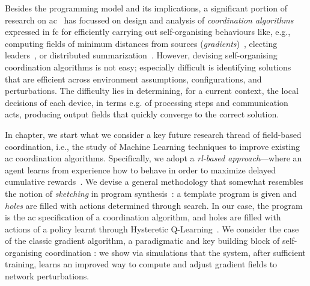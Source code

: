 Besides the programming model and its implications,
 a significant portion of research on \ac{ac}~\cite{DBLP:journals/jlap/ViroliBDACP19} has focussed
 on design and analysis of \emph{coordination algorithms} expressed in \ac{fc}
 for efficiently carrying out self-organising behaviours
 like, e.g., computing fields of minimum distances from sources (\emph{gradients})~\cite{DBLP:conf/ipsn/NagpalSB03,DBLP:journals/pervasive/MameiZL04,DBLP:conf/saso/AudritoCDV17},
 electing leaders~\cite{DBLP:conf/saso/MoBD18},
 or %
 distributed summarization~\cite{DBLP:journals/cee/AudritoCDPV21}.
%
However, devising self-organising coordination algorithms is not easy; especially difficult is identifying solutions
 that are efficient across environment assumptions, configurations, and perturbations.
%
The difficulty lies in determining, 
 for a current context,
 the local decisions of each device, 
 in terms e.g. of processing steps and communication acts,
 producing output fields that quickly converge to the correct solution.

In chapter, we start what we consider a key future research thread of field-based coordination, i.e.,
 the study of Machine Learning techniques 
 to improve existing \ac{ac} coordination algorithms.
%
Specifically, we adopt a \emph{\ac{rl}-based approach}---where an agent learns from experience
 how to behave in order to maximize delayed cumulative rewards~\cite{sutton2018reinforcement-learning}.
%
We devise a general methodology that somewhat resembles the notion of \emph{sketching} in program synthesis~\cite{solar2008program-synthesis-sketching}:
 a template program is given and \emph{holes} are filled with actions determined through search.
%
In our case, the program is the \ac{ac} specification of a coordination algorithm, and holes are filled with actions of a policy learnt through Hysteretic Q-Learning~\cite{DBLP:conf/iros/MatignonLF07}.
%
We consider the case of the classic gradient algorithm, a paradigmatic and key building block of self-organising coordination \cite{DBLP:journals/jlap/ViroliBDACP19,beal2013organizing-aggregate,DBLP:journals/corr/abs-2201-03473}: we show via simulations 
 that the system, after sufficient training,
 learns an improved way to compute and adjust gradient fields to network perturbations.


